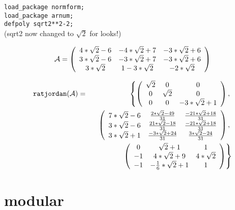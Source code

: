 {\tt load\_package normform;} \\
{\tt load\_package arnum;} \\
{\tt defpoly sqrt2**2-2;} \\
(sqrt2 now changed to ${\sqrt{2}}$ for looks!) 
\vspace{0.2in}

\begin{displaymath}
{\cal A} = \left( \begin{array}{ccc} 4*{\sqrt{2}}-6 & -4*{\sqrt{2}}+7 &
-3*{\sqrt{2}}+6 \\ 3*{\sqrt{2}}-6 & -3*{\sqrt{2}}+7 & -3*{\sqrt{2}}+6 
\\ 3*{\sqrt{2}} & 1-3*{\sqrt{2}} & -2*{\sqrt{2}}   \end{array} \right)
\end{displaymath} 
\vspace{0.2in}

\begin{eqnarray}
{\tt ratjordan}({\cal A}) & = & 
\left\{ \left( \begin{array}{ccc} {\sqrt{2}} & 0 & 0 \\ 0 & {\sqrt{2}} 
& 0 \\ 0 & 0 & -3*{\sqrt{2}}+1 \end{array} \right), \right. \nonumber 
\\ & & \hspace{0.1in} \left. \left( \begin{array}{ccc} 7*{\sqrt{2}}-6 
& \frac{2*{\sqrt{2}}-49}{31} & \frac{-21*{\sqrt{2}}+18}{31} \\ 
3*{\sqrt{2}}-6 & \frac{21*{\sqrt{2}}-18}{31} & \frac{-21*{\sqrt{2}}+18}
{31} \\ 3*{\sqrt{2}}+1 & \frac{-3*{\sqrt{2}}+24}{31} & 
\frac{3*{\sqrt{2}}-24}{31} \end{array} \right), \right. \nonumber \\ & 
& \hspace{0.1in} \left. \left( \begin{array}{ccc} 0 & {\sqrt{2}}+1 & 
1 \\ -1 & 4*{\sqrt{2}}+9 & 4*{\sqrt{2}} \\ -1 & -\frac{1}{6}*{\sqrt{2}}
+1 & 1 \end{array} \right) \right\} \nonumber 
\end{eqnarray}

\newpage


\section{modular}

